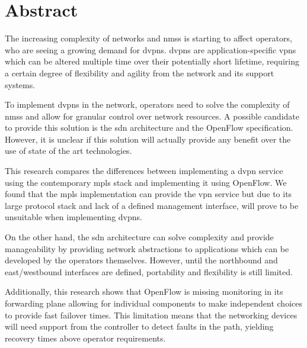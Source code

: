 \vspace*{\fill}
{\section*{Abstract}
\label{sec:summary}

The increasing complexity of networks and \acsp{nms} is starting to affect operators, who are seeing a growing demand for \aclp{dvpn}. \acsp{dvpn} are application-specific \acsp{vpn} which can be altered multiple time over their potentially short lifetime, requiring a certain degree of flexibility and agility from the network and its support systems.

To implement \acsp{dvpn} in the network, operators need to solve the complexity of \acsp{nms} and allow for granular control over network resources. A possible candidate to provide this solution is the \acs{sdn} architecture and the OpenFlow specification. However, it is unclear if this solution will actually provide any benefit over the use of state of the art technologies.

This research compares the differences between implementing a \acs{dvpn} service using the contemporary \acs{mpls} stack and implementing it using OpenFlow. 
We found that the \acs{mpls} implementation can provide the \acs{vpn} service but due to its large protocol stack and lack of a defined management interface, will prove to be unsuitable when implementing \acsp{dvpn}. 

On the other hand, the \acs{sdn} architecture can solve complexity and provide manageability by providing network abstractions to applications which can be developed by the operators themselves. However, until the northbound and east/westbound interfaces are defined, portability and flexibility is still limited. 

Additionally, this research shows that OpenFlow is missing monitoring in its forwarding plane allowing for individual components to make independent choices to provide fast failover times. This limitation means that the networking devices will need support from the controller to detect faults in the path, yielding recovery times above operator requirements.

}
\vspace*{\fill}